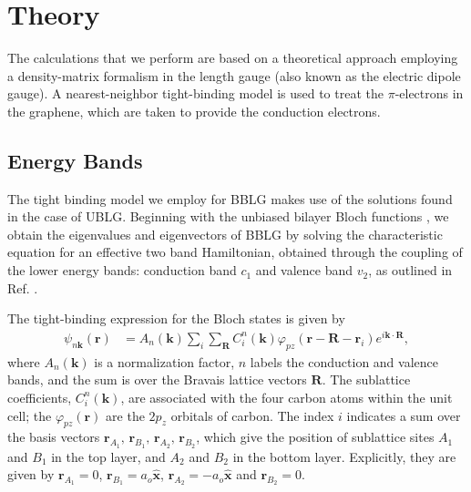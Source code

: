 \documentclass[twocolumn,secnumarabic,amssymb, nobibnotes, aps, prd, superscriptaddress]{revtex4-1}
\begin{document}
\section{Theory}\label{sec:2}
The calculations that we perform are based on a theoretical approach employing a density-matrix formalism in the length gauge (also known as the electric dipole gauge).  A nearest-neighbor tight-binding model is used to treat the $\pi$-electrons in the graphene, which are taken to provide the conduction electrons\cite{sarma2011electronic}. 
\subsection{Energy Bands}
The tight binding model we employ for BBLG makes use of the solutions found in the case of UBLG. Beginning with the unbiased bilayer Bloch functions \cite{mcgouran2016nonlinear}, we obtain the eigenvalues and eigenvectors of BBLG by solving the characteristic equation for an effective two band Hamiltonian, obtained through the coupling of the lower energy bands: conduction band $c_{1}$ and valence band $v_{2}$, as outlined in Ref. \cite{mcgouran2016nonlinear}. 

The tight-binding expression for the Bloch states is given by 
\begin{equation}\begin{aligned}\psi_{n\mathbf{k}}(\mathbf{r}) & =A_{n}\left(\mathbf{k}\right)\sum_{i}\sum_{\mathbb{\mathbf{R}}}C_{i}^{n}\left(\mathbf{k}\right)\varphi_{pz}\left(\mathbf{r}-\mathbf{R-r}_{i}\right)e^{i\mathbf{k}\cdot\mathbf{R}},\end{aligned}
\end{equation}
where $A_{n}\left(\mathbf{k}\right)$ is a normalization factor, $n$ labels the conduction and valence bands, and the sum is over the Bravais lattice vectors $\mathbf{R}$. The sublattice coefficients, $C_{i}^{n}\left(\mathbf{k}\right)$,
 are associated with the four carbon atoms within the unit cell; the $\varphi_{pz}\left(\mathbf{r}\right)$ are the $2p_{z}$ orbitals of carbon. The index $i$ indicates a sum over the basis vectors $\mathbf{r}_{A_{1}},\,\mathbf{r}_{B_{1}},\,\mathbf{r}_{A_{2}},\,\mathbf{r}_{B_{2}}$, which give the position of sublattice sites $A_{1}$ and $B_{1}$  in the top layer, and $A_{2}$ and $B_{2}$ in the bottom layer. Explicitly, they are given by $\mathbf{r}_{A_{1}}=0$, $\mathbf{r}_{B_{1}}=a_{o}\widehat{\mathbf{x}}$, $\mathbf{r}_{A_{2}}=-a_{o}\widehat{\mathbf{x}}$ and $\mathbf{r}_{B_{2}}=0$.
\end{document}
